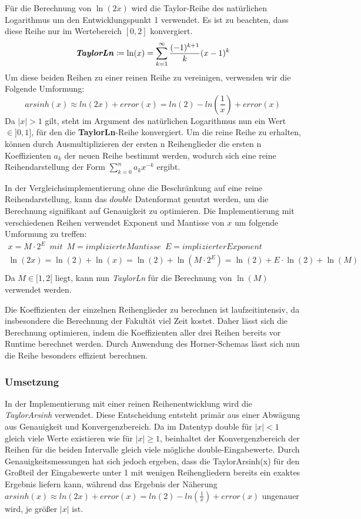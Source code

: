 \documentclass[course=erap] {aspdoc}
\begin{document}
    Für die Berechnung von $\ln(2x)$ wird die Taylor-Reihe des natürlichen Logarithmus um den Entwicklungspunkt 1 verwendet.
    Es ist zu beachten, dass diese Reihe nur im Wertebereich $[0, 2]$ konvergiert.
    \[
        \textbf{\textit{TaylorLn}}\coloneqq\ln(x) = \sum_{k = 1}^{\infty} \frac{(-1)^{k + 1}}{k}(x - 1)^k
    \]
    Um diese beiden Reihen zu einer reinen Reihe zu vereinigen, verwenden wir die Folgende Umformung:
    \[
        arsinh(x)\approx ln(2x) + error(x) = ln(2) - ln(\frac{1}{x}) + error(x)
    \]
    Da $|x|>1$ gilt, steht im Argument des natürlichen Logarithmus nun ein Wert $\in ]0, 1]$, für den die \textbf{TaylorLn}-Reihe konvergiert.
    Um die reine Reihe zu erhalten, können durch Ausmultiplizieren der ersten n Reihenglieder die ersten n Koeffizienten $a_k$ der neuen Reihe bestimmt werden, wodurch sich eine reine Reihendarstellung der Form $\sum_{k=0}^{n} a_k x^{-k}$ ergibt.

    
    
    In der Vergleichsimplementierung ohne die Beschränkung auf eine reine Reihendarstellung, kann das $double$ Datenformat genutzt werden, um die Berechnung signifikant auf Genauigkeit zu optimieren. Die Implementierung mit verschiedenen Reihen verwendet Exponent und Mantisse von $x$ um folgende Umformung zu treffen:
    \begin{gather*}
        x = M\cdot2^E \,\,\, mit \,\,\, M = implizierte Mantisse \,\,\, E = implizierter Exponent\\
        \ln(2x) = \ln(2) + \ln(x) = \ln(2) + \ln(M\cdot2^E) = \ln(2) + E\cdot\ln(2) + \ln(M)\\
    \end{gather*}
    Da $M\in[1, 2[$ liegt, kann nun \textit{TaylorLn} für die Berechnung von $\ln(M)$ verwendet werden.

    
    Die Koeffizienten der einzelnen Reihenglieder zu berechnen ist laufzeitintensiv, da insbesondere die Berechnung der Fakultät viel Zeit kostet.
    Daher lässt sich die Berechnung optimieren, indem die Koeffizienten aller drei Reihen bereits vor Runtime berechnet werden.
    Durch Anwendung des Horner-Schemas lässt sich nun die Reihe besonders effizient berechnen.

    \subsubsection{Umsetzung}
    In der Implementierung mit einer reinen Reihenentwicklung wird die \textit{TaylorArsinh} verwendet. Diese Entscheidung entsteht primär aus einer Abwägung aus Genauigkeit und Konvergenzbereich. Da im Datentyp double für $|x|<1$ gleich viele Werte existieren wie für $|x|\geq1$, beinhaltet der Konvergenzbereich der Reihen für die beiden Intervalle gleich viele mögliche double-Eingabewerte. Durch Genauigkeitsmessungen hat sich jedoch ergeben, dass die TaylorArsinh(x) für den Großteil der Eingabewerte unter 1 mit wenigen Reihengliedern bereits ein exaktes Ergebnis liefern kann, während das Ergebnis der Näherung $ arsinh(x)\approx ln(2x) + error(x) = ln(2) - ln(\frac{1}{x}) + error(x)$ ungenauer wird, je größer $|x|$ ist. 
\end{document}
